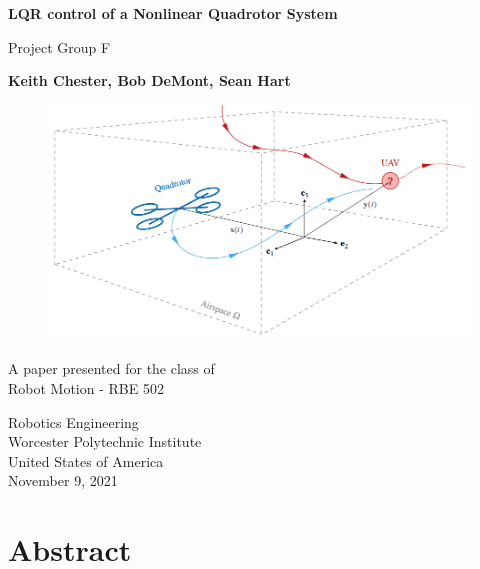 \documentclass{article}
\begin{document}
\begin{titlepage}
   \begin{center}
       \vspace*{1cm}
        \Huge
       \textbf{LQR control of a Nonlinear Quadrotor System}
        \Large
        
       \vspace{0.5cm}
        Project Group F
            
       \vspace{1.5cm}

       \textbf{Keith Chester, Bob DeMont, Sean Hart}
\begin{figure}[H]
    \centering
    \includegraphics[width =1\textwidth]{images/ProjProbStmt.png}
     \label{fig:prob}
\end{figure}


       \vfill
            
       A paper presented for the class of\\
       Robot Motion - RBE 502
            
       \vspace{0.8cm}
     
            
       Robotics Engineering\\
       Worcester Polytechnic Institute\\
       United States of America\\
       November 9, 2021
            
   \end{center}
\end{titlepage}


\section*{Abstract}
\end{document}
